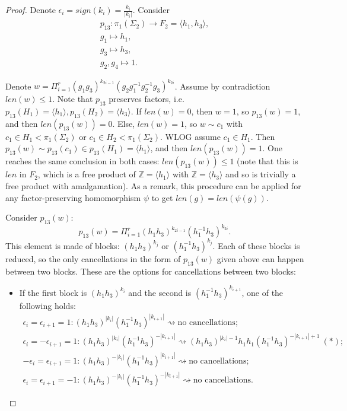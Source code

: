 \documentclass[11pt]{article}
\newenvironment{myequation}
    {
        \begin{equation*}
        \begin{gathered}
    }
    { 
        \end{gathered} 
        \end{equation*}
    }
\newcommand{\Z}{\mathbb{Z}}
\begin{document}
    \begin{proof}
        Denote $\epsilon_i = sign(k_i) = \frac{k_i}{|k_i|}$. Consider
        \begin{myequation}
            p_{13}: \pi_1(\Sigma_2) \to F_2 = \langle h_1, h_3 \rangle ,\\
            g_1 \mapsto h_1 ,\\
            g_3 \mapsto h_3 ,\\
            g_2, g_4 \mapsto 1 .
        \end{myequation}
        
        Denote $w = \Pi_{i=1}^r (g_1 g_3)^{k_{2i-1}} (g_2 g_1^{-1} g_2^{-1} g_3)^{k_{2i}}$. Assume by contradiction $len(w) \leq 1$. Note that $p_{13}$ preserves factors, i.e. $p_{13}(H_1) = \langle h_1 \rangle, p_{13}(H_2) = \langle h_3 \rangle$. If $len(w) = 0$, then $w = 1$, so $p_{13}(w) = 1$, and then $len(p_{13}(w)) = 0$. Else, $len(w) = 1$, so $w \sim c_1$ with $c_1 \in H_1 < \pi_1(\Sigma_2)$ or $c_1 \in H_2 < \pi_1(\Sigma_2)$. WLOG assume $c_1 \in H_1$. Then $p_{13}(w) \sim p_{13}(c_1) \in p_{13}(H_1) = \langle h_1 \rangle$, and then $len(p_{13}(w)) = 1$. One reaches the same conclusion in both cases: $len(p_{13}(w)) \leq 1$ (note that this is $len$ in $F_2$, which is a free product of $\Z = \langle h_1 \rangle$ with $\Z = \langle h_3 \rangle$ and so is trivially a free product with amalgamation). As a remark, this procedure can be applied for any factor-preserving homomorphism $\psi$ to get $len(g) = len(\psi(g))$.
        
        Consider $p_{13}(w)$:
        \[
            p_{13}(w) = \Pi_{i=1}^r (h_1 h_3)^{k_{2i-1}} (h_1^{-1} h_3)^{k_{2i}} .
        \]
        This element is made of blocks: $(h_1 h_3)^{k_j}$ or $(h_1^{-1} h_3)^{k_j}$. Each of these blocks is reduced, so the only cancellations in the form of $p_{13}(w)$ given above can happen between two blocks. These are the options for cancellations between two blocks:

        \begin{itemize}
        \item If the first block is $(h_1 h_3)^{k_i}$ and the second is $(h_1^{-1} h_3)^{k_{i+1}}$, one of the following holds:
        \begin{myequation}
                \epsilon_i = \epsilon_{i+1} = 1: (h_1 h_3)^{|k_i|} (h_1^{-1} h_3)^{|k_{i+1}|} \rightsquigarrow \text{no cancellations} ; \\
                \epsilon_i = -\epsilon_{i+1} = 1: (h_1 h_3)^{|k_i|} (h_1^{-1} h_3)^{-|k_{i+1}|} \rightsquigarrow (h_1 h_3)^{|k_i|-1} h_1 h_1 (h_1^{-1} h_3)^{-|k_{i+1}|+1} \ (*) ; \\
                - \epsilon_i = \epsilon_{i+1} = 1: (h_1 h_3)^{-|k_i|} (h_1^{-1} h_3)^{|k_{i+1}|} \rightsquigarrow \text{no cancellations} ; \\
                \epsilon_i = \epsilon_{i+1} = -1: (h_1 h_3)^{-|k_i|} (h_1^{-1} h_3)^{-|k_{i+1}|} \rightsquigarrow \text{no cancellations}.
            \end{myequation}
            

\end{itemize}
\end{proof}
\end{document}
